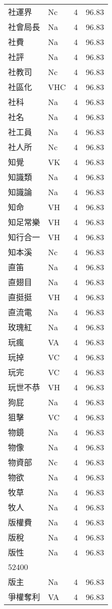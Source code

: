 \documentclass[twocolumn]{book}
\begin{document}
\begin{supertabular}{llrr}
社運界 & Nc & 4 &  96.83\\
社會局長 & Na & 4 &  96.83\\
社費 & Na & 4 &  96.83\\
社評 & Na & 4 &  96.83\\
社教司 & Nc & 4 &  96.83\\
社區化 & VHC & 4 &  96.83\\
社科 & Na & 4 &  96.83\\
社名 & Na & 4 &  96.83\\
社工員 & Na & 4 &  96.83\\
社人所 & Nc & 4 &  96.83\\
知覺 & VK & 4 &  96.83\\
知識類 & Na & 4 &  96.83\\
知識論 & Na & 4 &  96.83\\
知命 & VH & 4 &  96.83\\
知足常樂 & VH & 4 &  96.83\\
知行合一 & VH & 4 &  96.83\\
知本溪 & Nc & 4 &  96.83\\
直笛 & Na & 4 &  96.83\\
直翅目 & Na & 4 &  96.83\\
直挺挺 & VH & 4 &  96.83\\
直流電 & Na & 4 &  96.83\\
玫瑰紅 & Na & 4 &  96.83\\
玩瘋 & VA & 4 &  96.83\\
玩掉 & VC & 4 &  96.83\\
玩完 & VC & 4 &  96.83\\
玩世不恭 & VH & 4 &  96.83\\
狗屁 & Na & 4 &  96.83\\
狙擊 & VC & 4 &  96.83\\
物鏡 & Na & 4 &  96.83\\
物像 & Na & 4 &  96.83\\
物資部 & Nc & 4 &  96.83\\
物欲 & Na & 4 &  96.83\\
牧草 & Na & 4 &  96.83\\
牧人 & Na & 4 &  96.83\\
版權費 & Na & 4 &  96.83\\
版稅 & Na & 4 &  96.83\\
版性 & Na & 4 &  96.83\\
52400\\
版主 & Na & 4 &  96.83\\
爭權奪利 & VA & 4 &  96.83\\

\end{supertabular}
\end{document}

